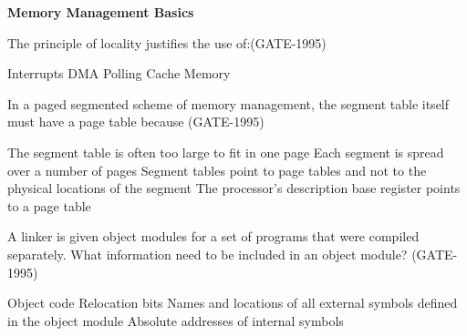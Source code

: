 \centerline{\textbf{ \LARGE Memory Management Basics}}

\setcounter{question}{0}




\begin{questyle}

  \question  The principle of locality justifies the use of:(GATE-1995)

  \begin{oneparchoices}
    \choice Interrupts
    \choice DMA
    \choice Polling
    \choice Cache Memory
  \end{oneparchoices}
\end{questyle}


\begin{questyle}

  \question  In a paged segmented scheme of memory management, the segment table itself must have
             a page table because (GATE-1995)

  \begin{choices}
    \choice The segment table is often too large to fit in one page
    \choice Each segment is spread over a number of pages
    \choice Segment tables point to page tables and not to the physical locations of the segment
    \choice The processor’s description base register points to a page table
  \end{choices}
\end{questyle}


\begin{questyle}

  \question  A linker is given object modules for a set of programs that were compiled separately. What information need to be included in an object module? (GATE-1995)

  \begin{choices}
    \choice Object code
    \choice Relocation bits
    \choice Names and locations of all external symbols defined in the object module
    \choice Absolute addresses of internal symbols
  \end{choices}
\end{questyle}


